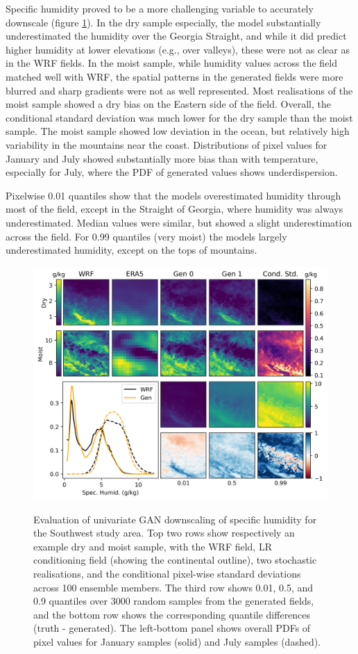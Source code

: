 \documentclass{ametsocV6.1}
\begin{document}
Specific humidity proved to be a more challenging variable to accurately downscale (figure \ref{humidity}). In the dry sample especially, the model substantially underestimated the humidity over the Georgia Straight, and while it did predict higher humidity at lower elevations (e.g., over valleys), these were not as clear as in the WRF fields. In the moist sample, while humidity values across the field matched well with WRF, the spatial patterns in the generated fields were more blurred and sharp gradients were not as well represented. Most realisations of the moist sample showed a dry bias on the Eastern side of the field. Overall, the conditional standard deviation was much lower for the dry sample than the moist sample. The moist sample showed low deviation in the ocean, but relatively high variability in the mountains near the coast. Distributions of pixel values for January and July showed substantially more bias than with temperature, especially for July, where the PDF of generated values shows underdispersion. 

Pixelwise 0.01 quantiles show that the models overestimated humidity through most of the field, except in the Straight of Georgia, where humidity was always underestimated. Median values were similar, but showed a slight underestimation across the field. For 0.99 quantiles (very moist) the models largely underestimated humidity, except on the tops of mountains.
\begin{figure}[H]
  \noindent\includegraphics[width=\textwidth,angle=0]{final/Humidity_Fig.png}\\
  \caption{Evaluation of univariate GAN downscaling of specific humidity for the Southwest study area. Top two rows show respectively an example dry and moist sample, with the WRF field, LR conditioning field (showing the continental outline), two stochastic realisations, and the conditional pixel-wise standard deviations across 100 ensemble members. The third row shows 0.01, 0.5, and 0.9 quantiles over 3000 random samples from the generated fields, and the bottom row shows the corresponding quantile differences (truth - generated). The left-bottom panel shows overall PDFs of pixel values for January samples (solid) and July samples (dashed).}\label{humidity}
\end{figure}
\end{document}
